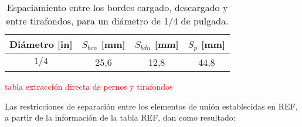 \begin{table}[h]
\centering
{}
\caption{Esfuerzos admisibles y factor de seguridad para distintas longitudes de tirafondo.}
\label{tab:res_tirafondos}
\end{table}

\begin{table}[h]
\centering
\begin{tabular}{@{}cccc@{}}
\toprule
Diámetro [in] & $S_{bcn}$ [mm] & $S_{bdn}$ [mm] & $S_p$ [mm] \\ \midrule
$1/4$ & 25,6 & 12,8 & 44,8 \\ \bottomrule
\end{tabular}
\caption{Espaciamiento entre los bordes cargado, descargado y entre tirafondos, para un diámetro de 1/4 de pulgada.}
\label{tab:res_septirafondo}
\end{table}

\textcolor{red}{tabla extracción directa de pernos y tirafondos}

Las restricciones de separación entre los elementos de unión establecidas en REF, a partir de la información de la tabla REF, dan como resultado:

